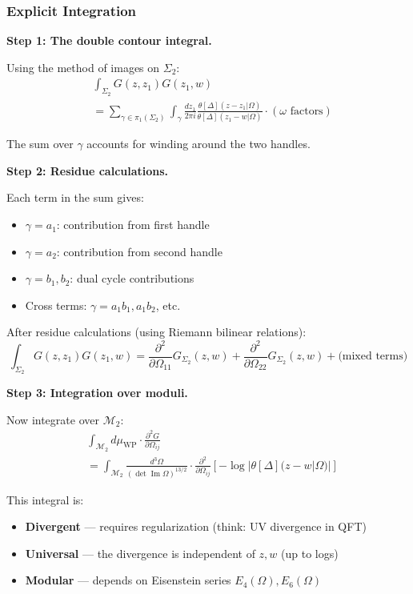 \subsubsection{Explicit Integration}

\textbf{Step 1: The double contour integral.}

Using the method of images on $\Sigma_2$:
\begin{align}
&\int_{\Sigma_2} G(z, z_1) G(z_1, w) \\
&= \sum_{\gamma \in \pi_1(\Sigma_2)} 
\int_{\gamma} \frac{dz_1}{2\pi i} 
\frac{\theta[\Delta](z - z_1 | \Omega)}{\theta[\Delta](z_1 - w | \Omega)} 
\cdot (\omega \text{ factors})
\end{align}

The sum over $\gamma$ accounts for winding around the two handles.

\textbf{Step 2: Residue calculations.}

Each term in the sum gives:
\begin{itemize}
\item $\gamma = a_1$: contribution from first handle
\item $\gamma = a_2$: contribution from second handle  
\item $\gamma = b_1, b_2$: dual cycle contributions
\item Cross terms: $\gamma = a_1 b_1, a_1 b_2$, etc.
\end{itemize}

After residue calculations (using Riemann bilinear relations):
$$\int_{\Sigma_2} G(z, z_1) G(z_1, w) = 
\frac{\partial^2}{\partial \Omega_{11}} G_{\Sigma_2}(z, w) 
+ \frac{\partial^2}{\partial \Omega_{22}} G_{\Sigma_2}(z, w)
+ \text{(mixed terms)}$$

\textbf{Step 3: Integration over moduli.}

Now integrate over $\mathcal{M}_2$:
\begin{align}
&\int_{\mathcal{M}_2} d\mu_{\text{WP}} \cdot 
\frac{\partial^2 G}{\partial \Omega_{ij}} \\
&= \int_{\mathcal{M}_2} \frac{d^3\Omega}{(\det \operatorname{Im} \Omega)^{13/2}}
\cdot \frac{\partial^2}{\partial \Omega_{ij}} 
\left[ -\log|\theta[\Delta](z-w|\Omega)| \right]
\end{align}

This integral is:
\begin{itemize}
\item \textbf{Divergent} --- requires regularization (think: UV divergence in QFT)
\item \textbf{Universal} --- the divergence is independent of $z, w$ (up to logs)
\item \textbf{Modular} --- depends on Eisenstein series $E_4(\Omega), E_6(\Omega)$
\end{itemize}

